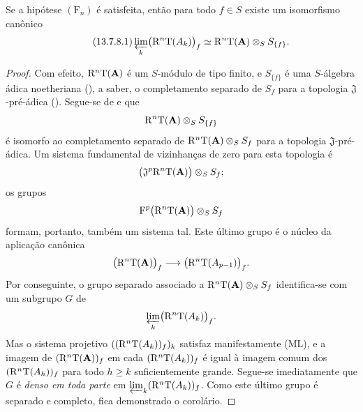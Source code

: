 \begin{corollary}[13.7.8]
\label{0.13.7.8}
Se a hipótese $(\mathrm{F}_n)$ é satisfeita, então para todo $f\in S$
existe um isomorfismo canônico
\begin{equation}
\label{0.13.7.8.1}
\tag{13.7.8.1}
  \varprojlim_k\bigl(\RR^n\mathrm{T}(A_k)\bigr)_f
  \isoto
  \RR^n\mathrm{T}(\bb{A})\otimes_S S_{\{f\}}.
\end{equation}
\end{corollary}

\begin{proof}
Com efeito, $\mathrm{R}^n\mathrm{T}(\mathbf{A})$ é um $S$-módulo de tipo finito,
e $S_{\{f\}}$ é uma $S$-álgebra ádica noetheriana
(), a saber, o completamento separado
de $S_f$ para a topologia $\mathfrak{J}$-pré-ádica
().
Segue-se de  e
 que
\[
  \mathrm{R}^n\mathrm{T}(\mathbf{A})\otimes_S S_{\{f\}}
\]
é isomorfo ao completamento separado de
$\mathrm{R}^n\mathrm{T}(\mathbf{A})\otimes_S S_f$ para a
topologia $\mathfrak{J}$-pré-ádica.
Um sistema fundamental de vizinhanças de zero para esta topologia
é
\[
  \bigl(
    \mathfrak{J}^p\mathrm{R}^n\mathrm{T}(\mathbf{A})
  \bigr)\otimes_S S_f;
\]
os grupos
\[
  \mathrm{F}^p\bigl(\mathrm{R}^n\mathrm{T}(\mathbf{A})\bigr)
  \otimes_S S_f
\]
formam, portanto, também um sistema tal.
Este último grupo é o núcleo da aplicação canônica
\[
  \bigl(\mathrm{R}^n\mathrm{T}(\mathbf{A})\bigr)_f
  \longrightarrow
  \bigl(\mathrm{R}^n\mathrm{T}(A_{p-1})\bigr)_f.
\]
Por conseguinte, o grupo separado associado a
$\mathrm{R}^n\mathrm{T}(\mathbf{A})\otimes_S S_f$ identifica-se com um subgrupo
$G$ de
\[
  \varprojlim_k\bigl(\mathrm{R}^n\mathrm{T}(A_k)\bigr)_f.
\]
Mas o sistema projetivo
$((\mathrm{R}^n\mathrm{T}(A_k))_f)_k$ satisfaz manifestamente {\rm(ML)}, e a
imagem de $(\mathrm{R}^n\mathrm{T}(\mathbf{A}))_f$ em cada
$(\mathrm{R}^n\mathrm{T}(A_k))_f$ é igual à imagem comum dos
$(\mathrm{R}^n\mathrm{T}(A_h))_f$ para todo $h\geq k$ suficientemente grande.
Segue-se imediatamente que $G$ é \emph{denso em toda parte} em
$\varprojlim_k(\mathrm{R}^n\mathrm{T}(A_k))_f$.
Como este último grupo é separado e completo, fica demonstrado o
corolário.
\end{proof}
